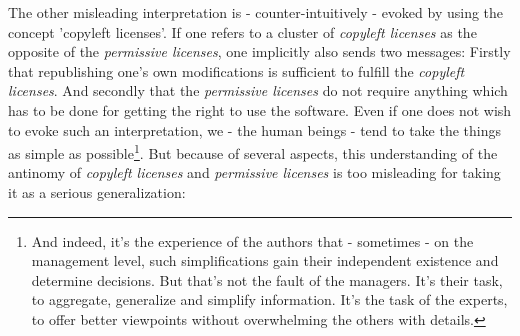 The other misleading interpretation is - counter-intuitively - evoked by using
the concept 'copyleft licenses'. If one refers to a cluster of \emph{copyleft
licenses} as the opposite of the \emph{permissive licenses}, one implicitly also
sends two messages: Firstly that republishing one's own modifications
is sufficient to fulfill the \emph{copyleft licenses}. And secondly that the
\emph{permissive licenses} do not require anything which has to be done for
getting the right to use the software. Even if one does not wish to evoke such
an interpretation, we - the human beings - tend to take the things as simple as
possible\footnote{And indeed, it's the experience of the authors that -
sometimes - on the management level, such simplifications gain their independent
existence and determine decisions. But that's not the fault of the managers.
It's their task, to aggregate, generalize and simplify information. It's the
task of the experts, to offer better viewpoints without overwhelming the others
with details.}. But because of several aspects, this understanding of the
antinomy of \emph{copyleft licenses} and \emph{permissive licenses} is too
misleading for taking it as a serious generalization:

